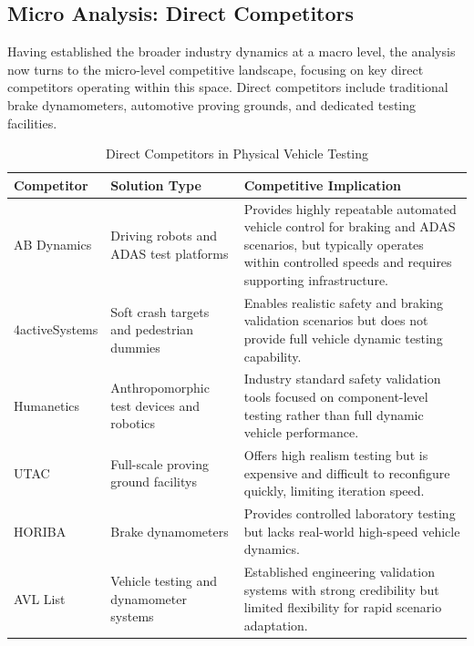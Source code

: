\subsection{Micro Analysis: Direct Competitors}

Having established the broader industry dynamics at a macro level, the analysis now turns to the micro-level competitive landscape, focusing on key direct competitors operating within this space. Direct competitors include traditional brake dynamometers, automotive proving grounds, and dedicated testing facilities. 

\begin{table}[h]
\centering
\caption{Direct Competitors in Physical Vehicle Testing}
\label{tab:direct_competitors}
\footnotesize
\singlespacing
\begin{tabularx}{\textwidth}{|p{2.8cm}|p{3.2cm}|X|}
\hline
\textbf{Competitor} & \textbf{Solution Type} & \textbf{Competitive Implication} \\
\hline
AB Dynamics \cite{abdynamics_testing} & Driving robots and ADAS test platforms & Provides highly repeatable automated vehicle control for braking and ADAS scenarios, but typically operates within controlled speeds and requires supporting infrastructure. \\
\hline
4activeSystems \cite{activesystems_testing} & Soft crash targets and pedestrian dummies & Enables realistic safety and braking validation scenarios but does not provide full vehicle dynamic testing capability. \\
\hline
Humanetics & Anthropomorphic test devices and robotics & Industry standard safety validation tools focused on component-level testing rather than full dynamic vehicle performance. \\
\hline
UTAC \cite{utac_millbrook} & Full-scale proving ground facilitys & Offers high realism testing but is expensive and difficult to reconfigure quickly, limiting iteration speed. \\
\hline
HORIBA \cite{horiba_mobility} & Brake dynamometers & Provides controlled laboratory testing but lacks real-world high-speed vehicle dynamics. \\
\hline
AVL List & Vehicle testing and dynamometer systems & Established engineering validation systems with strong credibility but limited flexibility for rapid scenario adaptation. \\
\hline
\end{tabularx}
\end{table}

